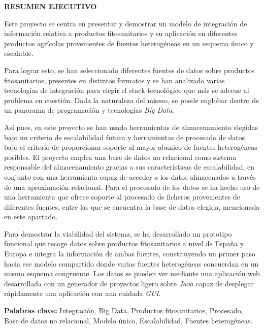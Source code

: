 \begin{center}

{\Large \bfseries RESUMEN EJECUTIVO}

\vspace{1.5cm}
\end{center}


Este proyecto se centra en presentar y demostrar un modelo de integración de información relativa a productos fitosanitarios y su aplicación en diferentes productos agrícolas provenientes de fuentes heterogéneas en un esquema único y escalable. \par
Para lograr esto, se han seleccionado diferentes fuentes de datos sobre productos fitosanitarios, presentes en distintos formatos y se han analizado varias tecnologías de integración para elegir el stack tecnológico que más se adecue al problema en cuestión. Dada la naturaleza del mismo, se puede englobar dentro de un panorama de programación y tecnologías \textit{Big Data}.
\par
Así pues, en este proyecto se han usado herramientas de almacenamiento elegidas bajo un criterio de escalabilidad futura y herramientas de procesado de datos bajo el criterio de proporcionar soporte al mayor abanico de fuentes heterogéneas posibles. El proyecto emplea una base de datos no relacional como sistema responsable del almacenamiento gracias a sus características de escalabilidad, en conjunto con una herramienta capaz de acceder a los datos almacenados a través de una aproximación relacional. Para el procesado de los datos se ha hecho uso de una herramienta que ofrece soporte al procesado de ficheros provenientes de diferentes fuentes, entre las que se encuentra la base de datos elegida, mencionada en este apartado.\par
Para demostrar la viabilidad del sistema, se ha desarrollado un prototipo funcional que recoge datos sobre productos fitosanitarios a nivel de España y Europa e integra la información de ambas fuentes, constituyendo un primer paso hacia ese modelo compartido donde varias fuentes heterogéneas concuerdan en un mismo esquema congruente. Los datos se pueden ver mediante una aplicación web desarrollada con un generador de proyectos ligero sobre \textit{Java} capaz de desplegar rápidamente una aplicación con una cuidada \textit{GUI}.  \\\par

\textbf{Palabras clave:} Integración, Big Data, Productos fitosanitarios, Procesado, Base de datos no relacional, Modelo único, Escalabilidad, Fuentes heterogéneas.

